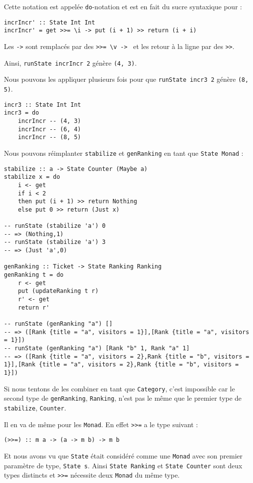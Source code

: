 \documentclass{llncs}
\begin{document}
Cette notation est appelée \lstinline{do}-notation et est en fait du sucre syntaxique
pour :
\begin{lstlisting}
incrIncr' :: State Int Int
incrIncr' = get >>= \i -> put (i + 1) >> return (i + i)
\end{lstlisting}
Les \lstinline{->} sont remplacés par des \lstinline{>>= \v -> } et les retour à
la ligne par des \lstinline{>>}.

Ainsi, \lstinline{runState incrIncr 2} génère \lstinline{(4, 3)}.

Nous pouvons les appliquer plusieurs fois pour que \lstinline{runState incr3 2} génère \lstinline{(8, 5)}.
\begin{lstlisting}
incr3 :: State Int Int
incr3 = do
    incrIncr -- (4, 3)
    incrIncr -- (6, 4)
    incrIncr -- (8, 5)
\end{lstlisting}

Nous pouvons réimplanter \lstinline{stabilize} et \lstinline{genRanking} en tant
que \lstinline{State Monad} :
\begin{lstlisting}
stabilize :: a -> State Counter (Maybe a)
stabilize x = do
    i <- get
    if i < 2
    then put (i + 1) >> return Nothing
    else put 0 >> return (Just x)

-- runState (stabilize 'a') 0
-- => (Nothing,1)
-- runState (stabilize 'a') 3
-- => (Just 'a',0)

genRanking :: Ticket -> State Ranking Ranking
genRanking t = do
    r <- get
    put (updateRanking t r)
    r' <- get
    return r'

-- runState (genRanking "a") []
-- => ([Rank {title = "a", visitors = 1}],[Rank {title = "a", visitors = 1}])
-- runState (genRanking "a") [Rank "b" 1, Rank "a" 1] 
-- => ([Rank {title = "a", visitors = 2},Rank {title = "b", visitors = 1}],[Rank {title = "a", visitors = 2},Rank {title = "b", visitors = 1}])
\end{lstlisting}

Si nous tentons de les combiner en tant que \lstinline{Category}, c'est impossible
car le second type de \lstinline{genRanking}, \lstinline{Ranking}, n'est pas le
même que le premier type de \lstinline{stabilize}, \lstinline{Counter}.

Il en va de même pour les \lstinline{Monad}.
En effet \lstinline{>>=} a le type suivant :
\begin{lstlisting}
(>>=) :: m a -> (a -> m b) -> m b
\end{lstlisting}

Et nous avons vu que \lstinline{State} était considéré comme une \lstinline{Monad}
avec son premier paramètre de type, \lstinline{State s}.
Ainsi \lstinline{State Ranking} et \lstinline{State Counter} sont deux types distincts
et \lstinline{>>=} nécessite deux \lstinline{Monad} du même type.
\end{document}
